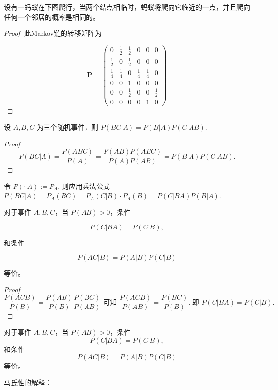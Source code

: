 \documentclass[lang=cn,10pt,thmcnt=section]{elegantbook}
\begin{document}
\begin{example}
	设有一蚂蚁在下图爬行，当两个结点相临时，蚂蚁将爬向它临近的一点，并且爬向任何一个邻居的概率是相同的。

\begin{figure}[h]
    \centering
\end{figure}
\end{example}
\begin{proof}
	此Markov链的转移矩阵为

\[
\mathbf{P} = \begin{pmatrix}
0 & \frac{1}{2} & \frac{1}{2} & 0 & 0 & 0 \\
\frac{1}{2} & 0 & \frac{1}{2} & 0 & 0 & 0 \\
\frac{1}{4} & \frac{1}{4} & 0 & \frac{1}{4} & \frac{1}{4} & 0 \\
0 & 0 & 1 & 0 & 0 & 0 \\
0 & 0 & \frac{1}{2} & 0 & 0 & \frac{1}{2} \\
0 & 0 & 0 & 0 & 1 & 0
\end{pmatrix}
\]
\end{proof}

\begin{theorem}
	设 $A, B, C$ 为三个随机事件，则 $P(BC|A) = P(B|A)P(C|AB)$.
\end{theorem}
\begin{proof}
	\[
P(BC|A) = \frac{P(ABC)}{P(A)} = \frac{P(AB)P(ABC)}{P(A)P(AB)} = P(B|A)P(C|AB).
\]
\end{proof}
\begin{remark}
	令 $P(\cdot|A) := P_A$, 则应用乘法公式 $P(BC|A) = P_A(BC) = P_A(C|B) \cdot P_A(B) = P(C|BA)P(B|A)$.

\end{remark}
\begin{theorem}
	对于事件 $A, B, C$，当 $P(AB) > 0$，条件

\[
P(C|BA) = P(C|B),
\]

和条件

\[
P(AC|B) = P(A|B)P(C|B)
\]

等价。
\end{theorem}
\begin{proof}
	\[
\frac{P(ACB)}{P(B)} = \frac{P(AB)}{P(B)} \frac{P(BC)}{P(AB)} \text{ 可知 } \frac{P(ACB)}{P(AB)} = \frac{P(BC)}{P(B)}. \text{ 即 } P(C|BA) = P(C|B).
\]
\end{proof}
\begin{theorem}
	对于事件 $A, B, C$，当 $P(AB) > 0$，条件
\[ P(C|BA) = P(C|B), \]
和条件
\[ P(AC|B) = P(A|B)P(C|B) \]
等价。


\end{theorem}
马氏性的解释：
\end{document}
